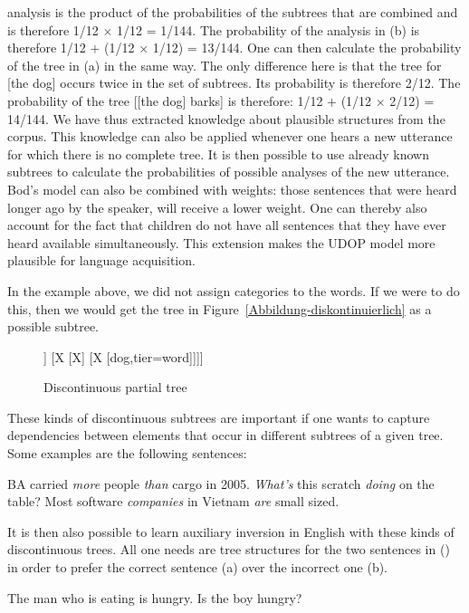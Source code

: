 analysis is the product of the probabilities of the subtrees that are combined and is therefore 1/12 $\times$ 1/12 = 1/144.
The probability of the analysis in (b) is therefore 1/12 $+$ (1/12 $\times$ 1/12) = 13/144.
One can then calculate the probability of the tree in (a) in the same way. The only difference here is that the tree for
[the dog] occurs twice in the set of subtrees. Its probability is therefore
 2/12. The probability of the tree [[the dog] barks] is therefore:
 1/12 $+$ (1/12 $\times$ 2/12) = 14/144. We have thus extracted knowledge about plausible structures from the corpus. This knowledge can
also  be applied whenever one hears a new utterance for which there is no complete tree. It is then possible to use already known
 subtrees to calculate the probabilities of possible analyses of the new utterance.
Bod's model can also be combined with weights: those sentences that were heard longer ago by the speaker, will receive a lower weight.
One can thereby also account for the fact that children do not  have all sentences that they have ever heard available simultaneously. 
This extension makes the UDOP model more plausible for language acquisition.

In the example above, we did not assign categories to the words. If we were to do this, then we
would get the tree in Figure~\vref{Abbildung-diskontinuierlich} as a possible
subtree.
\begin{figure}
\centering
\begin{forest}
[X
	[X
		[watch,tier=word]]
	[X
		[X]
		[X
			[dog,tier=word]]]]
\end{forest}
\caption{\label{Abbildung-diskontinuierlich}Discontinuous partial tree}
\end{figure}%
These kinds of discontinuous subtrees are important if one wants to capture dependencies between elements that occur in different subtrees
of a given tree. Some examples are the following sentences:

\eal
\ex BA carried \emph{more} people \emph{than} cargo in 2005.
\ex \emph{What's} this scratch \emph{doing} on the table?
\ex Most software \emph{companies} in Vietnam \emph{are} small sized.
\zl

\noindent
It is then also possible to learn auxiliary inversion in English with these kinds of discontinuous
trees. All one needs are tree structures for the two sentences in () in order to prefer the correct sentence (a) over the incorrect one (b).

\eal
\label{Beispiel-Inversion}
\ex The man who is eating is hungry.
\ex Is the boy hungry?
\zl

